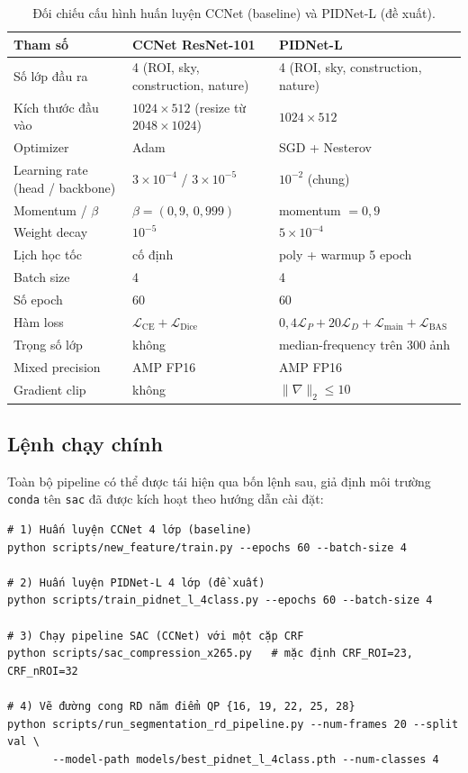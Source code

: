 \begin{table}[H]
\centering
\caption{Đối chiếu cấu hình huấn luyện CCNet (baseline) và PIDNet-L (đề xuất).}
\label{tab:train-config}
\small
\begin{tabular}{l|l|l}
\hline
\textbf{Tham số} & \textbf{CCNet ResNet-101} & \textbf{PIDNet-L} \\
\hline
Số lớp đầu ra & 4 (ROI, sky, construction, nature) & 4 (ROI, sky, construction, nature) \\
Kích thước đầu vào & $1024\times 512$ (resize từ $2048\times 1024$) & $1024\times 512$ \\
Optimizer & Adam & SGD + Nesterov \\
Learning rate (head / backbone) & $3\!\times\!10^{-4}$ / $3\!\times\!10^{-5}$ & $10^{-2}$ (chung) \\
Momentum / $\beta$ & $\beta = (0{,}9,\,0{,}999)$ & momentum $= 0{,}9$ \\
Weight decay & $10^{-5}$ & $5\!\times\!10^{-4}$ \\
Lịch học tốc & cố định & poly + warmup 5 epoch \\
Batch size & 4 & 4 \\
Số epoch & 60 & 60 \\
Hàm loss & $\mathcal{L}_\mathrm{CE} + \mathcal{L}_\mathrm{Dice}$ & $0{,}4\mathcal{L}_P + 20\mathcal{L}_D + \mathcal{L}_\mathrm{main} + \mathcal{L}_\mathrm{BAS}$ \\
Trọng số lớp & không & median-frequency trên 300 ảnh \\
Mixed precision & AMP FP16 & AMP FP16 \\
Gradient clip & không & $\|\nabla\|_2 \le 10$ \\
\hline
\end{tabular}
\end{table}

\subsection{Lệnh chạy chính}

Toàn bộ pipeline có thể được tái hiện qua bốn lệnh sau, giả định môi trường \texttt{conda} tên \texttt{sac} đã được kích hoạt theo hướng dẫn cài đặt:

\begin{verbatim}
# 1) Huấn luyện CCNet 4 lớp (baseline)
python scripts/new_feature/train.py --epochs 60 --batch-size 4

# 2) Huấn luyện PIDNet-L 4 lớp (đề xuất)
python scripts/train_pidnet_l_4class.py --epochs 60 --batch-size 4

# 3) Chạy pipeline SAC (CCNet) với một cặp CRF
python scripts/sac_compression_x265.py   # mặc định CRF_ROI=23, CRF_nROI=32

# 4) Vẽ đường cong RD năm điểm QP {16, 19, 22, 25, 28}
python scripts/run_segmentation_rd_pipeline.py --num-frames 20 --split val \
       --model-path models/best_pidnet_l_4class.pth --num-classes 4
\end{verbatim}

